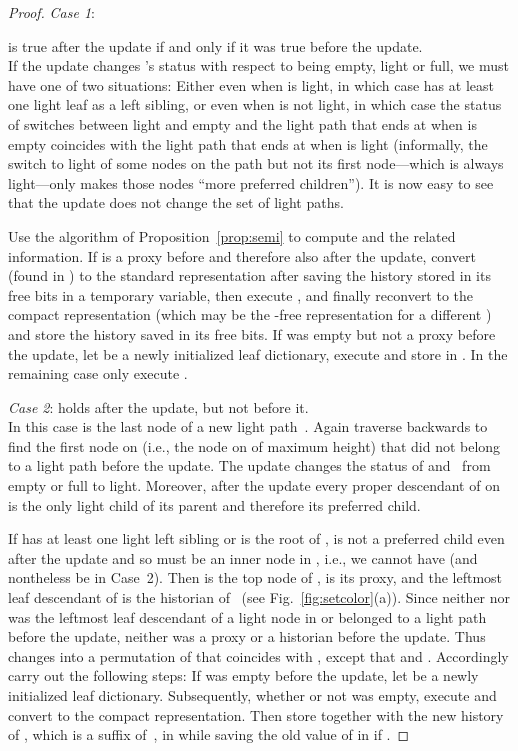 \documentclass[envcountsame,envcountsect,undated,nolinenumbers]{lnthi}
\begin{document}
\begin{proof}
\medskip
\emph{Case 1}:

is true after the update
if and only if it was true before the update.\\
If the update changes 's status with respect to
being empty, light or full, we must have one of
two situations:
Either  even when  is light,
in which case  has at least one
light leaf as a left sibling,
or  even when  is not light,
in which case the status of  switches between
light and empty and the light path that ends at
 when  is empty coincides with the
light path that ends at  when  is light
(informally, the switch to light of some nodes on the
path but not its first node---which
is always light---only makes
those nodes ``more preferred children'').
It is now easy to see that the update does
not change the set of light paths.

Use the algorithm of Proposition~\ref{prop:semi}
to compute  and the related information.
If  is a proxy before and therefore also after
the update, convert 
(found in ) to the standard representation
after saving the history stored in its free bits
in a temporary variable, then execute
, and finally reconvert
 to the compact representation
(which may be the -free representation for
a different ) and
store the history saved in its free bits.
If  was empty but not a proxy before the update,
let  be a newly initialized leaf dictionary, execute
 and store  in .
In the remaining case only execute
.

\medskip
\emph{Case 2}:
 holds
after the update, but not before it.\\
In this case  is the last node of
a new light path~.
Again traverse  backwards to find the
first node  on  (i.e., the node on
 of maximum height) that did not belong to
a light path before the update.
The update changes the status of  and~
from empty or full to light.
Moreover, after the update every proper descendant of 
on  is the only light child of its parent
and therefore its preferred child.

If  has at least one light left sibling
or is the root  of ,
 is not a preferred child even
after the update and so
must be an inner node in ,
i.e., we cannot have  (and
nontheless be in Case~2).
Then  is the top node of ,
 is its proxy,
and the leftmost leaf descendant 
of  is the historian of~ 
(see Fig.~\ref{fig:setcolor}(a)).
Since neither  nor  was the leftmost
leaf descendant
of a light node in  or
belonged to a light path before
the update, neither was a proxy or a
historian before the update.
Thus  changes into a permutation 
of  that coincides with , except that
 and
.
Accordingly carry out the following steps:
If  was empty before the update,
let  be a newly initialized leaf dictionary.
Subsequently, whether or not  was empty,
execute 
and convert  to the compact representation.
Then store  together with
the new history of , which
is a suffix of~, in 
while
saving the old value of  in  if .


\end{proof}
\end{document}
